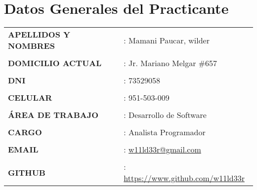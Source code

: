 \chapter{Datos Generales del Practicante}
	
	\begin{tabular}{ p{8cm} p{8cm} }
		{\bf APELLIDOS Y NOMBRES} & : Mamani Paucar, wilder \\\\
		{\bf DOMICILIO ACTUAL} & : Jr. Mariano Melgar \#657 \\\\
		{\bf DNI} & : 73529058 \\\\
		{\bf CELULAR} & : 951-503-009 \\\\
		{\bf ÁREA DE TRABAJO} & : Desarrollo de Software \\\\
		{\bf CARGO} & : Analista Programador \\\\
		{\bf EMAIL} & : \href{mailto:w11ld33r@gmail.com}{w11ld33r@gmail.com} \\\\
		{\bf GITHUB} & :
		\href{https://www.github.com/w11ld33r}{https://www.github.com/w11ld33r}
	\end{tabular}